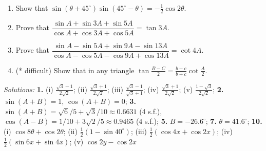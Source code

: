 \documentclass[
  english,
  12pt,
  oneside]{book}
\providecommand{\tightlist}{%
  \setlength{\itemsep}{0pt}\setlength{\parskip}{0pt}}
\theoremstyle{definition}
\theoremstyle{definition}
\theoremstyle{definition}
\theoremstyle{definition}
\theoremstyle{remark}
\begin{document}
\begin{enumerate}
  \begin{enumerate}
  \def\labelenumii{\roman{enumii})}
  \tightlist
  \item
    \(2\cos 5\theta \cos 3\theta\)
  \item
    \(\sin 25^\circ \cos 65^\circ\)
  \item
    \(\cos 3x \cos x\)
  \item
    \(\sin 5x \cos x\)
  \item
    \(2\sin (x + y) \sin (x - y)\)
  \end{enumerate}
\item
  Show that \(\sin(\theta+45^\circ)\sin(45^\circ-\theta) = -\frac{1}{2}\cos2\theta\).
\item
  Prove that \(\dfrac{\sin A+\sin 3A + \sin 5A}{\cos A+\cos 3A+\cos 5A}=\tan3A\).
\item
  Prove that \(\dfrac{\sin A-\sin 5A +\sin 9A -\sin13A}{\cos A-\cos 5A-\cos 9A+\cos 13 A}=\cot 4A\).
\item
  (* difficult) Show that in any triangle \(\tan\frac{B-C}{2}=\frac{b-c}{b+c}\cot\frac{A}{2}\).
\end{enumerate}

\emph{Solutions:}
\textbf{1.} (i) \(\frac{\sqrt{3}-1}{2\sqrt{2}}\); (ii) \(\frac{\sqrt{3}+1}{2\sqrt{2}}\); (iii) \(\frac{\sqrt{3}-1}{\sqrt{3}+1}\); (iv) \(\frac{\sqrt{3}+1}{2\sqrt{2}}\); (v) \(\frac{1-\sqrt{3}}{2\sqrt{2}}\);
\textbf{2.} \(\sin(A+B)=1\), \(\cos(A+B)=0\);
\textbf{3.} \(\sin(A+B)=\sqrt{6}/5+\sqrt{3}/10\approx 0.6631\) (4 s.f.), \(\cos(A-B)=1/10+3\sqrt{2}/5\approx 0.9465\) (4 s.f.);
\textbf{5.} \(B=-26.6^\circ\);
\textbf{7.} \(\theta= 41.6^\circ\);
\textbf{10.} (i) \(\cos8\theta+\cos2\theta\);
(ii) \(\frac12(1-\sin40^\circ)\);
(iii) \(\frac12(\cos 4x+\cos2x)\);
(iv) \(\frac12(\sin6x+\sin4x)\);
(v) \(\cos2y-\cos2x\)
\end{document}
